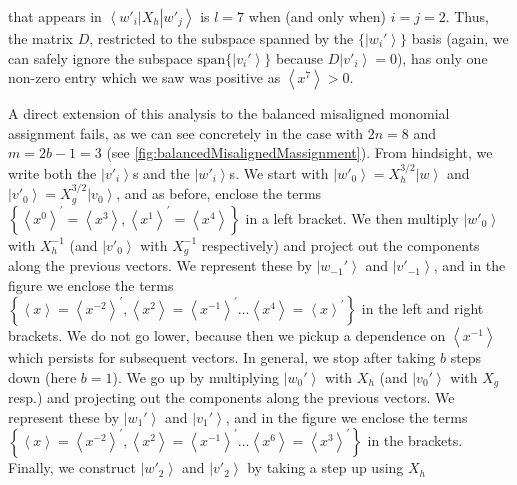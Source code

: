 \documentclass{article}
\begin{document}
that appears in $\left\langle w'_{i}\right|X_{h}\left|w'_{j}\right\rangle $
is $l=7$ when (and only when) $i=j=2$. Thus, the matrix $D$, restricted
to the subspace spanned by the $\{\left|w_{i}'\right\rangle \}$ basis
(again, we can safely ignore the subspace $\text{span}\{\left|v_{i}'\right\rangle \}$
because $D\left|v'_{i}\right\rangle =0$), has only one non-zero entry
which we saw was positive as $\left\langle x^{7}\right\rangle >0$.

A direct extension of this analysis to the balanced
misaligned monomial assignment fails, as we can see concretely in the case with $2n=8$ and
$m=2b-1=3$ (see  \cref{fig:balancedMisalignedMassignment}). From hindsight,
we write both the $\left|v'_{i}\right\rangle $s and the $\left|w'_{i}\right\rangle $s.
We start with $\left|w'_{0}\right\rangle =X_{h}^{3/2}\left|w\right\rangle $
and $\left|v'_{0}\right\rangle =X_{g}^{3/2}\left|v_{0}\right\rangle $,
and as before, enclose the terms $\left\{ \left\langle x^{0}\right\rangle ^{\prime}=\left\langle x^{3}\right\rangle ,\left\langle x^{1}\right\rangle ^{\prime}=\left\langle x^{4}\right\rangle \right\} $
in a left bracket. We then multiply $\left|w'_{0}\right\rangle $
with $X_{h}^{-1}$ (and $\left|v'_{0}\right\rangle $ with $X_{g}^{-1}$
respectively) and project out the components along the previous
vectors. We represent these by $\left|w_{-1}'\right\rangle $ and
$\left|v'_{-1}\right\rangle $, and in the figure we enclose the terms
$\left\{ \left\langle x\right\rangle =\left\langle x^{-2}\right\rangle ^{\prime},\left\langle x^{2}\right\rangle =\left\langle x^{-1}\right\rangle ^{\prime}\dots\left\langle x^{4}\right\rangle =\left\langle x\right\rangle ^{\prime}\right\} $
in the left and right brackets. We do not go lower, because then we
pickup a dependence on $\left\langle x^{-1}\right\rangle $ which persists for subsequent vectors. In general, we stop after taking
$b$ steps down (here $b=1$). We go up by multiplying $\left|w_{0}'\right\rangle $ with $X_{h}$ (and $\left|v_{0}'\right\rangle $
with $X_{g}$ resp.) and projecting out the components along the previous
vectors. We represent these by $\left|w_{1}'\right\rangle $ and  $\left|v_{1}'\right\rangle $, and in
the figure we enclose the terms $\left\{ \left\langle x\right\rangle =\left\langle x^{-2}\right\rangle ^{\prime},\left\langle x^{2}\right\rangle =\left\langle x^{-1}\right\rangle ^{\prime}\dots\left\langle x^{6}\right\rangle =\left\langle x^{3}\right\rangle ^{\prime}\right\} $
in the brackets. Finally, we construct $\left|w'_{2}\right\rangle $
and $\left|v'_{2}\right\rangle $ by taking a step up using $X_{h}$
\end{document}
